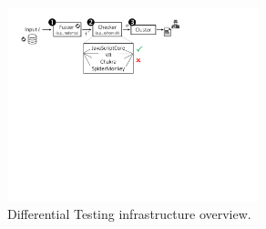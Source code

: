 \documentclass[sigconf,review, anonymous]{acmart}
\begin{document}







\begin{figure}[t]
  \centering
  \includegraphics[trim=0 350 0 0,clip,width=0.65\textwidth]{diff-testing-runtimes}
  \vspace{-5ex}  
  \caption{\label{fig:workflow}Differential Testing infrastructure overview.}
  \vspace{-2ex}
\end{figure}
\end{document}
